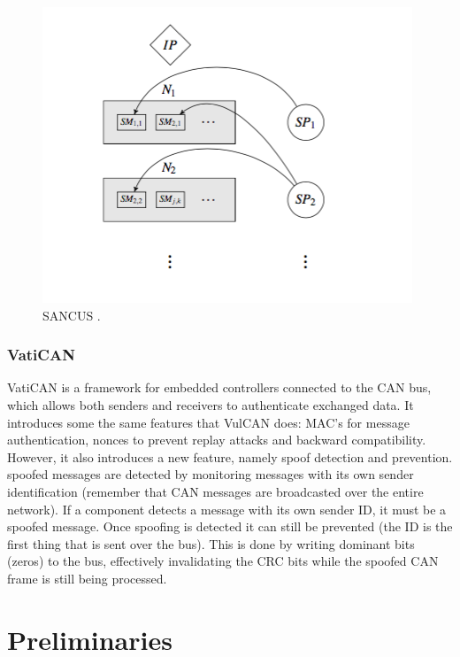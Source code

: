 \documentclass[11pt]{article}
\begin{document}
\begin{figure}[h]
	\label{fig:SANCUS}
	\centering
	\includegraphics[width=\textwidth]{SANCUS.png}
	\caption{SANCUS \cite{MillerC}.}
\end{figure} 

\subsubsection{VatiCAN} VatiCAN is a framework for embedded controllers connected to the CAN bus, which allows both senders and receivers to authenticate exchanged data. It introduces some the same features that VulCAN does: MAC's for message authentication, nonces to prevent replay attacks and backward compatibility. However, it also introduces a new feature, namely spoof detection and prevention. spoofed messages are detected by monitoring messages with its own sender identification (remember that CAN messages are broadcasted over the entire network). If a component detects a message with its own sender ID, it must be a spoofed message. Once spoofing is detected it can still be prevented (the ID is the first thing that is sent over the bus). This is done by writing dominant bits (zeros) to the bus, effectively invalidating the CRC bits while the spoofed CAN frame is still being processed.\cite{VatiCAN}

\section{Preliminaries}
\label{sec:preliminaries}
\end{document}
